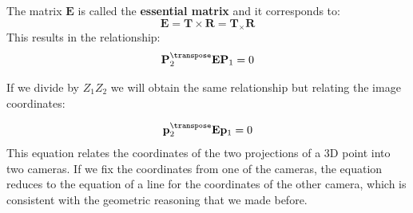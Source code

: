 
The matrix $\mathbf{E}$ is called the {\bf essential matrix} and it corresponds to: 
\begin{equation}
\mathbf{E} =  \mathbf{T} \times \mathbf{R} = \mathbf{T}_{\times} \mathbf{R}
\end{equation}
This results in the relationship:
\begin{equation}
\mathbf{P}_2^\transpose \mathbf{E} \mathbf{P}_1 = 0
\label{eq:relation3}
\end{equation}

If we divide \eqn{\ref{eq:relation3}} by $Z_1 Z_2$ we will obtain the same relationship but relating the image coordinates:

\begin{equation}
\mathbf{p}_2^\transpose \mathbf{E} \mathbf{p}_1 = 0
\label{eq:relation4}
\end{equation}
This equation relates the coordinates of the two projections of a 3D point into two cameras. If we fix the coordinates from one of the cameras, the equation reduces to the equation of a line for the coordinates of the other camera, which is consistent with the geometric reasoning that we made before.

